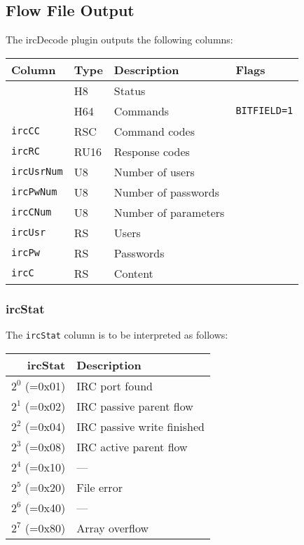 \documentclass[documentation]{subfiles}
\begin{document}
\subsection{Flow File Output}
The ircDecode plugin outputs the following columns:
\begin{longtable}{llll}
    \toprule
    {\bf Column} & {\bf Type} & {\bf Description} & {\bf Flags}\\
    \midrule\endhead%
    {\tt \nameref{ircStat}} & H8   & Status \\
    {\tt \nameref{ircCBF}}  & H64  & Commands & {\tt BITFIELD=1}\\
    {\tt ircCC}             & RSC  & Command codes \\
    {\tt ircRC}             & RU16 & Response codes \\
    {\tt ircUsrNum}         & U8   & Number of users\\
    {\tt ircPwNum}          & U8   & Number of passwords\\
    {\tt ircCNum}           & U8   & Number of parameters\\
    {\tt ircUsr}            & RS   & Users\\
    {\tt ircPw}             & RS   & Passwords\\
    {\tt ircC}              & RS   & Content\\
    \bottomrule
\end{longtable}

\subsubsection{ircStat}\label{ircStat}
The {\tt ircStat} column is to be interpreted as follows:
\begin{longtable}{rl}
    \toprule
    {\bf ircStat} & {\bf Description}\\
    \midrule\endhead%
    $2^0$ (=0x01) & IRC port found              \\ %
    $2^1$ (=0x02) & IRC passive parent flow     \\ %
    $2^2$ (=0x04) & IRC passive write finished  \\ %
    $2^3$ (=0x08) & IRC active parent flow      \\ %
    $2^4$ (=0x10) & ---                         \\
    $2^5$ (=0x20) & File error                  \\ %
    $2^6$ (=0x40) & ---                         \\
    $2^7$ (=0x80) & Array overflow              \\ %
    \bottomrule
\end{longtable}
\end{document}
